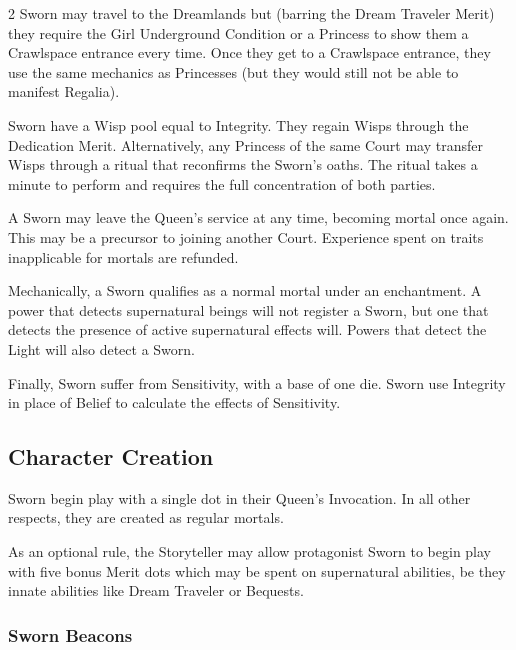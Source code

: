 \begin{multicols}{2}
Sworn may travel to the Dreamlands but (barring the Dream Traveler Merit) they require the Girl Underground Condition or a Princess to show them a Crawlspace entrance every time. Once they get to a Crawlspace entrance, they use the same mechanics as Princesses (but they would still not be able to manifest Regalia). 

Sworn have a Wisp pool equal to Integrity. They regain Wisps through the Dedication Merit. Alternatively, any Princess of the same Court may transfer Wisps through a ritual that reconfirms the Sworn's oaths. The ritual takes a minute to perform and requires the full concentration of both parties.

A Sworn may leave the Queen's service at any time, becoming mortal once again. This may be a precursor to joining another Court. Experience spent on traits inapplicable for mortals are refunded.

Mechanically, a Sworn qualifies as a normal mortal under an enchantment. A power that detects supernatural beings will not register a Sworn, but one that detects the presence of active supernatural effects will. Powers that detect the Light will also detect a Sworn. 

Finally, Sworn suffer from Sensitivity, with a base of one die. Sworn use Integrity in place of Belief to calculate the effects of Sensitivity.

\subsection*{Character Creation}

Sworn begin play with a single dot in their Queen's Invocation. In all other respects, they are created as regular mortals. 

As an optional rule, the Storyteller may allow protagonist Sworn to begin play with five bonus Merit dots which may be spent on supernatural abilities, be they innate abilities like Dream Traveler or Bequests.


\begin{mybox}

\subsubsection*{Sworn Beacons}


\end{mybox}
\end{multicols}

